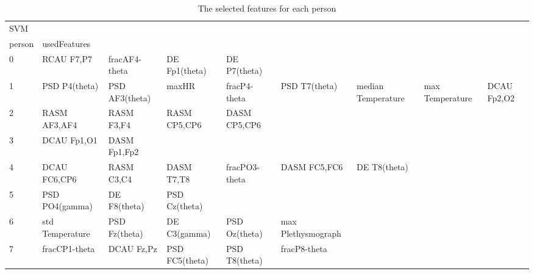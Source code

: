 \clearpage
\begin{landscape}
\begin{table}[]
\centering
\caption{The selected features for each person}
\begin{tabular}{l|llllllll}
SVM                &                      &                         &                      &                    &                       &                      &                 &                 \\
person             & usedFeatures         &                         &                      &                    &                       &                      &                 &                 \\
0                  & RCAU F7,P7           & fracAF4-theta           & DE Fp1(theta)        & DE P7(theta)       &                       &                      &                 &                 \\
1                  & PSD P4(theta)        & PSD AF3(theta)          & maxHR                & fracP4-theta       & PSD T7(theta)         & median Temperature   & max Temperature & DCAU Fp2,O2     \\
2                  & RASM AF3,AF4         & RASM F3,F4              & RASM CP5,CP6         & DASM CP5,CP6       &                       &                      &                 &                 \\
3                  & DCAU Fp1,O1          & DASM Fp1,Fp2            &                      &                    &                       &                      &                 &                 \\
4                  & DCAU FC6,CP6         & RASM C3,C4              & DASM T7,T8           & fracPO3-theta      & DASM FC5,FC6          & DE T8(theta)         &                 &                 \\
5                  & PSD PO4(gamma)       & DE F8(theta)            & PSD Cz(theta)        &                    &                       &                      &                 &                 \\
6                  & std Temperature      & PSD Fz(theta)           & DE C3(gamma)         & PSD Oz(theta)      & max Plethysmograph    &                      &                 &                 \\
7                  & fracCP1-theta        & DCAU Fz,Pz              & PSD FC5(theta)       & PSD T8(theta)      & fracP8-theta          &                      &                 &                 \\

\end{tabular}
\end{table}
\end{landscape}
